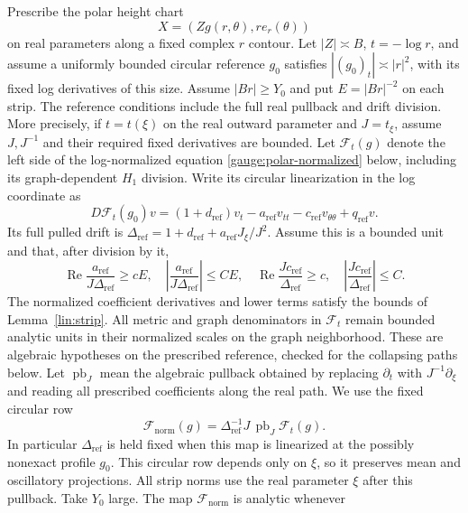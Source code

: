 \begin{lemma}\label{gauge:height}
Prescribe the polar height chart
\[
 X=(Zg(r,\theta),r e_r(\theta))
\]
on real parameters along a fixed complex $r$ contour.  Let $|Z|\asymp B$,
$t=-\log r$, and assume a uniformly bounded circular reference $g_0$ satisfies
$|(g_0)_t|\asymp |r|^2$, with its fixed log derivatives of this size.
Assume $|Br|\ge Y_0$ and put $E=|Br|^{-2}$ on each strip.  The reference
conditions include the full real pullback and drift division.  More precisely,
if $t=t(\xi)$ on the real outward parameter and $J=t_\xi$, assume
$J,J^{-1}$ and their required fixed derivatives are bounded.  Let
$\mathcal F_t(g)$ denote the left side of the log-normalized equation
\eqref{gauge:polar-normalized} below, including its graph-dependent
$H_1$ division.  Write its circular linearization in the log coordinate as
\[
 D\mathcal F_t(g_0)v=(1+d_{\mathrm{ref}})v_t-a_{\mathrm{ref}}v_{tt}
       -c_{\mathrm{ref}}v_{\theta\theta}+q_{\mathrm{ref}}v.
\]
Its full pulled drift is
$\Delta_{\mathrm{ref}}=1+d_{\mathrm{ref}}
             +a_{\mathrm{ref}}J_\xi/J^2$.
Assume this is a bounded unit and that, after division by it,
\[
 \operatorname{Re}\frac{a_{\mathrm{ref}}}{J\Delta_{\mathrm{ref}}}\ge cE,
 \quad \left|\frac{a_{\mathrm{ref}}}{J\Delta_{\mathrm{ref}}}\right|\le CE,
 \quad \operatorname{Re}\frac{Jc_{\mathrm{ref}}}{\Delta_{\mathrm{ref}}}\ge c,
 \quad \left|\frac{Jc_{\mathrm{ref}}}{\Delta_{\mathrm{ref}}}\right|\le C.
\]
The normalized coefficient derivatives and lower terms satisfy the bounds
of Lemma~\ref{lin:strip}.  All metric and graph denominators in
$\mathcal F_t$ remain bounded analytic units in their normalized scales
on the graph neighborhood.  These are algebraic hypotheses
on the prescribed reference, checked for the collapsing paths below.
Let $\operatorname{pb}_J$ mean the algebraic pullback obtained by replacing
$\partial_t$ with $J^{-1}\partial_\xi$ and reading all prescribed
coefficients along the real path.  We use the fixed circular row
\begin{equation}\label{gauge:fixed-row}
 \mathcal F_{\mathrm{norm}}(g)
   =\Delta_{\mathrm{ref}}^{-1}J\,\operatorname{pb}_J\mathcal F_t(g).
\end{equation}
In particular $\Delta_{\mathrm{ref}}$ is held fixed when this map is
linearized at the possibly nonexact profile $g_0$.  This circular row
depends only on $\xi$, so it preserves mean and oscillatory projections.
All strip norms use
the real parameter $\xi$ after this pullback.  Take $Y_0$ large.  The map
$\mathcal F_{\mathrm{norm}}$ is analytic whenever

\end{lemma}
